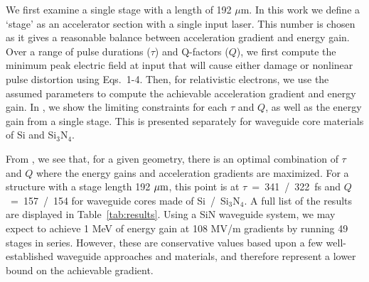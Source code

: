 
We first examine a single stage with a length of 192 $\mu$m.  In this work we define a `stage' as an accelerator section with a single input laser. This number is chosen as it gives a reasonable balance between acceleration gradient and energy gain.  Over a range of pulse durations ($\tau$) and Q-factors ($Q$), we first compute the minimum peak electric field at input that will cause either damage or nonlinear pulse distortion using Eqs.~1-4.  Then, for relativistic electrons, we use the assumed parameters to compute the achievable acceleration gradient and energy gain.  In , we show the limiting constraints for each $\tau$ and $Q$, as well as the energy gain from a single stage.  This is presented separately for waveguide core materials of Si and Si$_3$N$_4$.

From , we see that, for a given geometry, there is an optimal combination of $\tau$ and $Q$ where the energy gains and acceleration gradients are maximized. For a structure with a stage length 192 $\rm{\mu m}$, this point is at $\tau$~=~341~/~322~fs and $Q$~=~157~/~154 for waveguide cores made of Si~/~Si$_3$N$_4$.  A full list of the results are displayed in Table~\ref{tab:results}.  Using a SiN waveguide system, we may expect to achieve 1 MeV of energy gain at 108 MV/m gradients by running 49 stages in series.  However, these are conservative values based upon a few well-established waveguide approaches and materials, and therefore represent a lower bound on the achievable gradient.

